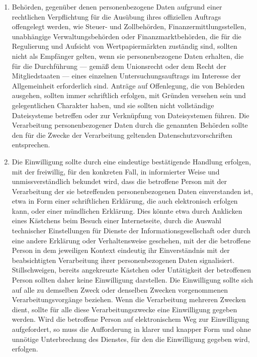 \begin{enumerate}
   \item Behörden, gegenüber denen personenbezogene Daten aufgrund einer rechtlichen Verpflichtung für die Ausübung
    ihres offiziellen Auftrags offengelegt werden, wie Steuer- und Zollbehörden, Finanzermittlungsstellen, unabhängige
    Verwaltungsbehörden oder Finanzmarktbehörden, die für die Regulierung und Aufsicht von Wertpapiermärkten zuständig
    sind, sollten nicht als Empfänger gelten, wenn sie personenbezogene Daten erhalten, die für die Durchführung —
    gemäß dem Unionsrecht oder dem Recht der Mitgliedstaaten — eines einzelnen Untersuchungsauftrags im Interesse der
    Allgemeinheit erforderlich sind. Anträge auf Offenlegung, die von Behörden ausgehen, sollten immer schriftlich
    erfolgen, mit Gründen versehen sein und gelegentlichen Charakter haben, und sie sollten nicht vollständige
    Dateisysteme betreffen oder zur Verknüpfung von Dateisystemen führen. Die Verarbeitung personenbezogener Daten
    durch die genannten Behörden sollte den für die Zwecke der Verarbeitung geltenden Datenschutzvorschriften
    entsprechen.%
   \label{eg:31}
   

   \item Die Einwilligung sollte durch eine eindeutige bestätigende Handlung erfolgen, mit der freiwillig, für den
    konkreten Fall, in informierter Weise und unmissverständlich bekundet wird, dass die betroffene Person mit der
    Verarbeitung der sie betreffenden personenbezogenen Daten einverstanden ist, etwa in Form einer schriftlichen
    Erklärung, die auch elektronisch erfolgen kann, oder einer mündlichen Erklärung. Dies könnte etwa durch Anklicken
    eines Kästchens beim Besuch einer Internetseite, durch die Auswahl technischer Einstellungen für Dienste der
    Informationsgesellschaft oder durch eine andere Erklärung oder Verhaltensweise geschehen, mit der die betroffene
    Person in dem jeweiligen Kontext eindeutig ihr Einverständnis mit der beabsichtigten Verarbeitung ihrer
    personenbezogenen Daten signalisiert. Stillschweigen, bereits angekreuzte Kästchen oder Untätigkeit der betroffenen
    Person sollten daher keine Einwilligung darstellen. Die Einwilligung sollte sich auf alle zu demselben Zweck oder
    denselben Zwecken vorgenommenen Verarbeitungsvorgänge beziehen. Wenn die Verarbeitung mehreren Zwecken dient,
    sollte für alle diese Verarbeitungszwecke eine Einwilligung gegeben werden. Wird die betroffene Person auf
    elektronischem Weg zur Einwilligung aufgefordert, so muss die Aufforderung in klarer und knapper Form und ohne
    unnötige Unterbrechung des Dienstes, für den die Einwilligung gegeben wird, erfolgen.%
   \label{eg:32}
   

\end{enumerate}
